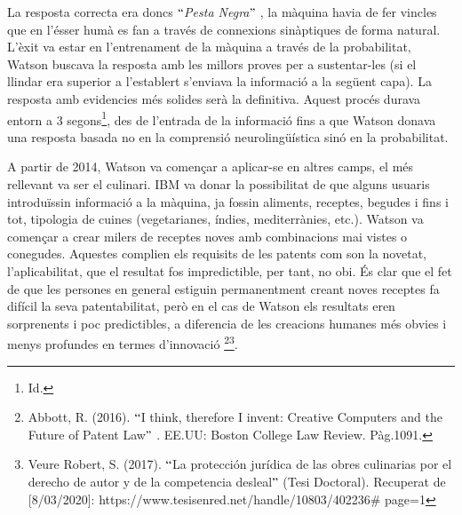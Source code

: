 \documentclass[12pt]{article}
\begin{document}
La resposta correcta era doncs $``$\textit{Pesta Negra}$"$ , la màquina havia de fer vincles que en l’ésser humà es fan a través de connexions sinàptiques de forma natural. L’èxit va estar en l’entrenament de la màquina a través de la probabilitat, Watson buscava la resposta amb les millors proves per a sustentar-les (si el llindar era superior a l’establert s’enviava la informació a la següent capa). La resposta amb evidencies més solides serà la definitiva. Aquest procés durava entorn a 3 segons\footnote{ Id. }, des de l’entrada de la informació fins a que Watson donava una resposta basada no en la comprensió neurolingüística sinó en la probabilitat.\par


\vspace{\baselineskip}
A partir de 2014, Watson va començar a aplicar-se en altres camps, el més rellevant va ser el culinari. IBM va donar la possibilitat de que alguns usuaris introduïssin informació a la màquina, ja fossin aliments, receptes, begudes i fins i tot, tipologia de cuines (vegetarianes, índies, mediterrànies, etc.). Watson va començar a crear milers de receptes noves amb combinacions mai vistes o conegudes. Aquestes complien els requisits de les patents com son la novetat, l’aplicabilitat, que el resultat fos impredictible, per tant, no obi. És clar que el fet de que les persones en general estiguin permanentment creant noves receptes fa difícil la seva patentabilitat, però en el cas de Watson els resultats eren sorprenents i poc predictibles, a diferencia de les creacions humanes més obvies i menys profundes en termes d’innovació \footnote{ Abbott, R. (2016). $``$I think, therefore I invent: Creative Computers and the Future of Patent Law$"$ . EE.UU: Boston College Law Review. Pàg.1091. }\footnote{ Veure Robert, S. (2017). $``$La protección jurídica de las obres culinarias por el derecho de autor y de la competencia desleal$"$  (Tesi Doctoral). Recuperat de [8/03/2020]: https://www.tesisenred.net/handle/10803/402236$\#$ page=1 }. \par
\end{document}

